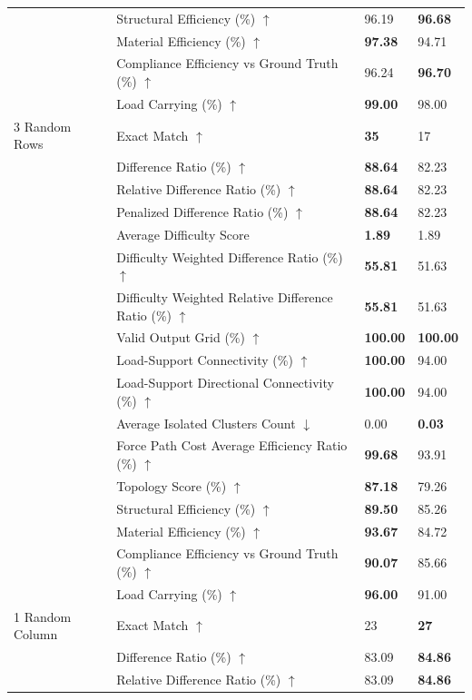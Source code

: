 \begin{table}[!h]
{\begin{tabular}{llll}
 & Structural Efficiency (\%) $\uparrow$ & 96.19 & \textbf{96.68} \\
 & Material Efficiency (\%) $\uparrow$ & \textbf{97.38} & 94.71 \\
 & Compliance Efficiency vs Ground Truth (\%) $\uparrow$ & 96.24 & \textbf{96.70} \\
 & Load Carrying (\%) $\uparrow$ & \textbf{99.00} & 98.00 \\
3 Random Rows & Exact Match $\uparrow$ & \textbf{35} & 17 \\
 & Difference Ratio (\%) $\uparrow$ & \textbf{88.64} & 82.23 \\
 & Relative Difference Ratio (\%) $\uparrow$ & \textbf{88.64} & 82.23 \\
 & Penalized Difference Ratio (\%) $\uparrow$ & \textbf{88.64} & 82.23 \\
 & Average Difficulty Score & \textbf{1.89} & 1.89 \\
 & Difficulty Weighted Difference Ratio (\%) $\uparrow$ & \textbf{55.81} & 51.63 \\
 & Difficulty Weighted Relative Difference Ratio (\%) $\uparrow$ & \textbf{55.81} & 51.63 \\
 & Valid Output Grid (\%) $\uparrow$ & \textbf{100.00} & \textbf{100.00} \\
 & Load-Support Connectivity (\%) $\uparrow$ & \textbf{100.00} & 94.00 \\
 & Load-Support Directional Connectivity (\%) $\uparrow$ & \textbf{100.00} & 94.00 \\
 & Average Isolated Clusters Count $\downarrow$ & 0.00 & \textbf{0.03} \\
 & Force Path Cost Average Efficiency Ratio (\%) $\uparrow$ & \textbf{99.68} & 93.91 \\
 & Topology Score (\%) $\uparrow$ & \textbf{87.18} & 79.26 \\
 & Structural Efficiency (\%) $\uparrow$ & \textbf{89.50} & 85.26 \\
 & Material Efficiency (\%) $\uparrow$ & \textbf{93.67} & 84.72 \\
 & Compliance Efficiency vs Ground Truth (\%) $\uparrow$ & \textbf{90.07} & 85.66 \\
 & Load Carrying (\%) $\uparrow$ & \textbf{96.00} & 91.00 \\
1 Random Column & Exact Match $\uparrow$ & 23 & \textbf{27} \\
 & Difference Ratio (\%) $\uparrow$ & 83.09 & \textbf{84.86} \\
 & Relative Difference Ratio (\%) $\uparrow$ & 83.09 & \textbf{84.86} \\

\end{tabular}}
\end{table}
